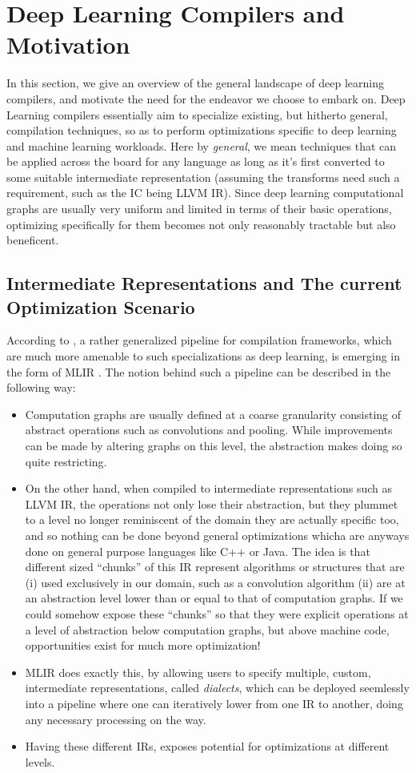 \documentclass[12pt,a4paper,twoside,openright,bibliography=totocnumbered]{report}
\begin{document}
\section{Deep Learning Compilers and Motivation}
In this section, we give an overview of the general landscape of deep learning compilers, and motivate the need for the endeavor we choose to embark on. Deep Learning compilers essentially aim to specialize existing, but hitherto general, compilation techniques, so as to perform optimizations specific to deep learning and machine learning workloads. Here by \textit{general}, we mean techniques that can be applied across the board for any language as long as it's first converted to some suitable intermediate representation (assuming the transforms need such a requirement, such as the IC being LLVM IR). Since deep learning computational graphs are usually very uniform and limited in terms of their basic operations, optimizing specifically for them becomes not only reasonably tractable but also beneficent. 

\subsection{Intermediate Representations and The current Optimization Scenario}
According to \cite{li2020deep}, a rather generalized pipeline for compilation frameworks, which are much more amenable to such specializations as deep learning, is emerging in the form of MLIR \cite{lattner2021mlir}. The notion behind such a pipeline can be described in the following way:
\begin{itemize}
	\item Computation graphs are usually defined at a coarse granularity consisting of abstract operations such as convolutions and pooling. While improvements can be made by altering graphs on this level, the abstraction makes doing so quite restricting.
	\item On the other hand, when compiled to intermediate representations such as LLVM IR, the operations not only lose their abstraction, but they plummet to a level no longer reminiscent of the domain they are actually specific too, and so nothing can be done beyond general optimizations whicha are anyways done on general purpose languages like C++ or Java. The idea is that different sized ``chunks'' of this IR represent algorithms or structures that are (i) used exclusively in our domain, such as a convolution algorithm (ii) are at an abstraction level lower than or equal to that of computation graphs. If we could somehow expose these ``chunks'' so that they were explicit operations at a level of abstraction below computation graphs, but above machine code, opportunities exist for much more optimization!
	\item MLIR does exactly this, by allowing users to specify multiple, custom, intermediate representations, called \textit{dialects}, which can be deployed seemlessly into a pipeline where one can iteratively lower from one IR to another, doing any necessary processing on the way.
	\item Having these different IRs, exposes potential for optimizations at different levels.
\end{itemize}
\end{document}
